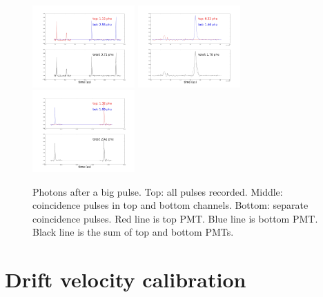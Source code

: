 \begin{center}
\begin{figure}[!htbp]
  \includegraphics[width=0.35\textwidth,clip,trim={0 600 0 0}]
  {Figures/Ch10/SampleWaveforms/_64767_a_+6_0_g_-6_0_PlotCoinWaveforms_Plotid11163_.jpg}
  \includegraphics[width=0.35\textwidth,clip,trim={0 600 0 0}]
  {Figures/Ch10/SampleWaveforms/_64767_a_+6_0_g_-6_0_PlotCoinWaveforms_Plotid11164_.jpg}
  \includegraphics[width=0.35\textwidth,clip,trim={0 600 0 0}]
  {Figures/Ch10/SampleWaveforms/_64767_a_+6_0_g_-6_0_PlotCoinWaveforms_Plotid11165_.jpg}
  \caption{Photons after a big pulse. Top: all pulses recorded. Middle: coincidence pulses in top and bottom channels. Bottom: separate coincidence pulses. Red line is top PMT. Blue line is bottom PMT. Black line is the sum of top and bottom PMTs. }
  \label{fig: Photons after a big pulse}
\end{figure}
\end{center}

\section{Drift velocity calibration}

